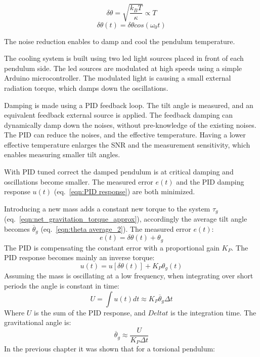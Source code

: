 \documentclass[\main/master.tex]{subfiles}
\begin{document}
\begin{equation}
\delta\theta = \sqrt{\frac{k_BT}{\kappa}}\propto{T}  \label{eqn:radiation force}
\end{equation}
\begin{equation}
\delta\theta(t) = \delta\theta cos(\omega_0 t)   \label{eqn:pid_error}
\end{equation}
\par\noindent
The noise reduction enables to damp and cool the pendulum temperature. 
\par\noindent
The cooling system is built using two led light sources placed in front of each pendulum side. The led sources are modulated at high speeds using a simple Arduino microcontroller. The modulated light is causing a small external radiation torque, which damps down the oscillations.
\par\noindent
Damping is made using a PID feedback loop. The tilt angle is measured, and an equivalent feedback external source is applied. The feedback damping can dynamically damp down the noises, without pre-knowledge of the existing noises. The PID can reduce the noises, and the effective temperature. Having a lower effective temperature enlarges the SNR and the measurement sensitivity, which enables measuring smaller tilt angles.


\par\noindent
With PID tuned correct the damped pendulum is at critical damping and oscillations become smaller. The measured error $e(t)$ and the PID damping response $u(t)$ (eq.~\ref{eqn:PID response}) are both minimized. 
\par\noindent
Introducing a new mass adds a constant new torque to the system $\tau_g$ (eq.~\ref{eqn:net_gravitation_torque_approx}), accordingly the average tilt angle becomes $\overline{\theta}_g$ (eq.~\ref{eqn:theta average_2}). The measured error $e(t)$:
\begin{equation}
e(t) = \delta\theta(t) + \theta_g    \label{eqn:error_measurement}
\end{equation}
The PID is compensating the constant error with a proportional gain $K_P$. The PID response becomes mainly an inverse torque:
\begin{equation}
u(t) = u[ \delta\theta(t)] + K_P\theta_g(t) \label{eqn:PID_response}
\end{equation}
Assuming the mass is oscillating at a low frequency, when integrating over short periods the angle is constant in time:
\begin{equation}
U = \int u(t) dt  \approx K_P\overline{\theta}_g\Delta t \label{eqn:PID_measurement_eqn}
\end{equation}
Where $U$ is the sum of the PID response, and $Delta t$ is the integration time. The gravitational angle is:
\begin{equation}
\overline{\theta}_g \approx \frac{U}{K_P\Delta t}      \label{eqn:pid_gravitation_torque}
\end{equation}
In the previous chapter it was shown that for a torsional pendulum:
\end{document}
